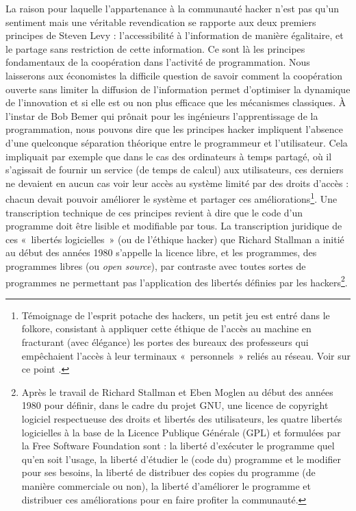 \documentclass{FramateX}
\begin{document}
\begin{refsection}
La raison pour laquelle l'appartenance à la communauté hacker n'est pas
qu'un sentiment mais une véritable revendication se rapporte aux deux
premiers principes de Steven Levy : l'accessibilité à l'information de
manière égalitaire, et le partage sans restriction de cette
information. Ce sont là les principes fondamentaux de la coopération
dans l'activité de programmation. Nous laisserons aux économistes la
difficile question de savoir comment la coopération ouverte sans
limiter la diffusion de l'information permet d'optimiser la dynamique
de l'innovation et si elle est ou non plus efficace que les mécanismes
classiques. À l'instar de Bob Bemer qui prônait pour les ingénieurs
l'apprentissage de la programmation, nous pouvons dire que les
principes hacker impliquent l'absence d'une quelconque séparation
théorique entre le programmeur et l'utilisateur. Cela impliquait par
exemple que dans le cas des ordinateurs à temps partagé, où il
s'agissait de fournir un service (de temps de calcul) aux utilisateurs,
ces derniers ne devaient en aucun cas voir leur accès au système limité
par des droits d'accès : chacun devait pouvoir améliorer le système et
partager ces améliorations\footnote{Témoignage de l'esprit potache
des hackers, un petit jeu est entré dans le folkore, consistant à
appliquer cette éthique de l'accès au machine en fracturant (avec
élégance) les portes des bureaux des professeurs qui empêchaient
l'accès à leur terminaux «~personnels~» reliés au réseau. Voir sur ce
point \cite[pp.~64-65]{williamsrichard2010}.}. Une transcription technique de
ces principes revient à dire que le code d'un programme doit être
lisible et modifiable par tous. La transcription juridique de ces
«~libertés logicielles~» (ou de l'éthique hacker) que Richard Stallman
a initié au début des années 1980 s'appelle la licence libre, et les
programmes, des programmes libres (ou \textit{open source}), par
contraste avec toutes sortes de programmes ne permettant pas
l'application des libertés définies par les hackers\footnote{Après le
travail de Richard Stallman et Eben Moglen au début des années 1980
pour définir, dans le cadre du projet GNU, une licence de copyright
logiciel respectueuse des droits et libertés des utilisateurs, les
quatre libertés logicielles à la base de la Licence Publique Générale
(GPL) et formulées par la Free Software Foundation sont : la liberté
d'exécuter le programme quel qu'en soit l'usage, la
liberté d'étudier le (code du) programme et le modifier pour ses
besoins, la liberté de distribuer des copies du programme (de manière
commerciale ou non), la liberté d'améliorer le programme et distribuer
ces améliorations pour en faire profiter la communauté.}.


\end{refsection}
\end{document}

